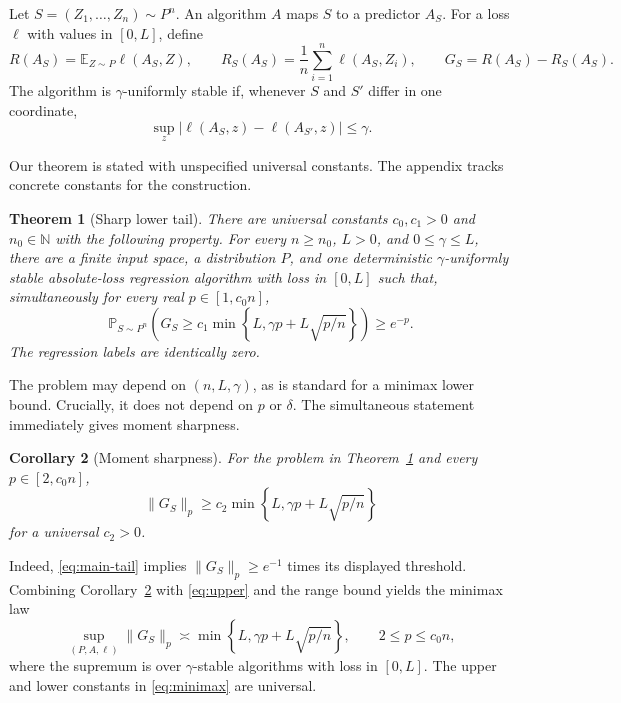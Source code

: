 \documentclass{article}
\newtheorem{theorem}{Theorem}
\newtheorem{corollary}[theorem]{Corollary}
\newcommand{\E}{\mathbb E}
\newcommand{\Pp}{\mathbb P}
\newcommand{\1}{\mathbf 1}
\begin{document}
Let $S=(Z_1,\ldots,Z_n)\sim P^n$. An algorithm $A$ maps $S$ to a predictor $A_S$. For a loss $\ell$ with values in $[0,L]$, define \[ R(A_S)=\E_{Z\sim P}\ell(A_S,Z), \qquad R_S(A_S)=\frac1n\sum_{i=1}^n\ell(A_S,Z_i), \qquad G_S=R(A_S)-R_S(A_S). \] The algorithm is $\gamma$-uniformly stable if, whenever $S$ and $S'$ differ in one coordinate,
\begin{equation}
 \sup_z|\ell(A_S,z)-\ell(A_{S'},z)|\le\gamma.
 \label{eq:stability}
\end{equation}

Our theorem is stated with unspecified universal constants. The appendix tracks concrete constants for the construction.

\begin{theorem}[Sharp lower tail]\label{thm:main}
There are universal constants $c_0,c_1>0$ and $n_0\in\mathbb N$ with the following property. For every $n\ge n_0$, $L>0$, and $0\le\gamma\le L$, there are a finite input space, a distribution $P$, and one deterministic $\gamma$-uniformly stable absolute-loss regression algorithm with loss in $[0,L]$ such that, simultaneously for every real $p\in[1,c_0n]$,
\begin{equation}
 \Pp_{S\sim P^n}\!\left(
 G_S\ge c_1\min\!\left\{L,\gamma p+L\sqrt{p/n}\right\}
 \right)\ge e^{-p}.
 \label{eq:main-tail}
\end{equation}
The regression labels are identically zero.
\end{theorem}

The problem may depend on $(n,L,\gamma)$, as is standard for a minimax lower bound. Crucially, it does not depend on $p$ or $\delta$. The simultaneous statement immediately gives moment sharpness.

\begin{corollary}[Moment sharpness]\label{cor:moments}
For the problem in Theorem~\ref{thm:main} and every $p\in[2,c_0n]$,
\begin{equation}
 \|G_S\|_p\ge c_2\min\!\left\{L,\gamma p+L\sqrt{p/n}\right\}
 \label{eq:moment-lower}
\end{equation}
for a universal $c_2>0$.
\end{corollary}

Indeed, \eqref{eq:main-tail} implies $\|G_S\|_p\ge e^{-1}$ times its displayed threshold. Combining Corollary~\ref{cor:moments} with \eqref{eq:upper} and the range bound yields the minimax law
\begin{equation}
 \sup_{(P,A,\ell)}\|G_S\|_p
 \asymp \min\!\left\{L,\gamma p+L\sqrt{p/n}\right\},
 \qquad 2\le p\le c_0n,
 \label{eq:minimax}
\end{equation}
where the supremum is over $\gamma$-stable algorithms with loss in $[0,L]$. The upper and lower constants in \eqref{eq:minimax} are universal.
\end{document}
